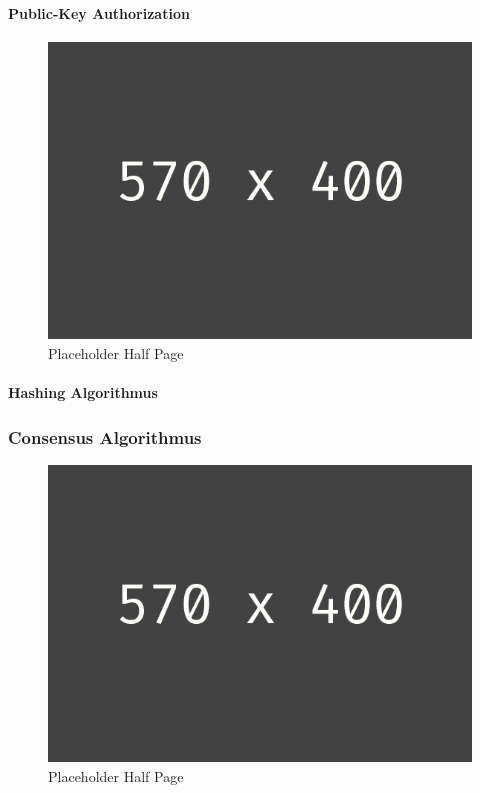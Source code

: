 \paragraph{Public-Key Authorization}
\begin{figure}[h!]
	\centering
	\includegraphics[width=1.0\linewidth]{pictures/placeholder_half_page}
	\caption[Placeholder Half Page]{Placeholder Half Page}
	\label{fig:placeholder_half_page}
\end{figure}


\paragraph{Hashing Algorithmus}


\subsubsection{Consensus Algorithmus}
\begin{figure}[h!]
	\centering
	\includegraphics[width=1.0\linewidth]{pictures/placeholder_half_page}
	\caption[Placeholder Half Page]{Placeholder Half Page}
	\label{fig:placeholder_half_page}
\end{figure}


